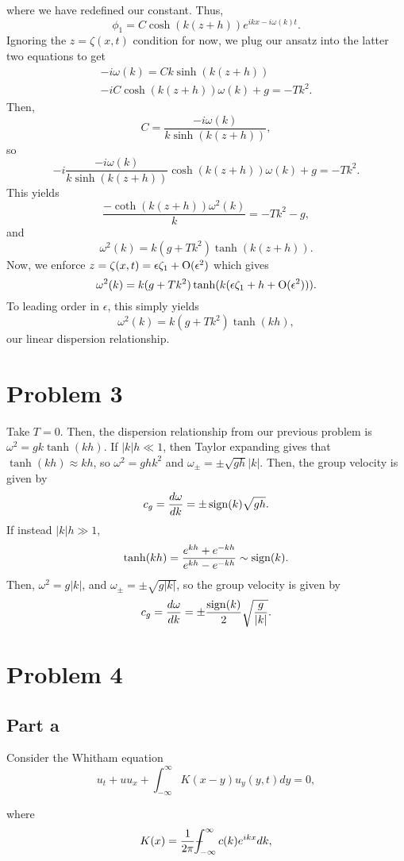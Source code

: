 \documentclass{article}
\begin{document}
where we have redefined our constant. Thus,
\[
\phi_1=C\cosh(k(z+h))e^{ikx-i\omega(k)t}.
\]
Ignoring the $z=\zeta(x,t)$ condition for now, we plug our ansatz into the latter two equations to get
\begin{eqnarray*}
	-i\omega(k)=Ck\sinh(k(z+h))\\
	-iC\cosh(k(z+h))\omega(k)+g=-Tk^2.
\end{eqnarray*}
Then,
\[
C=\frac{-i\omega(k)}{k\sinh(k(z+h))},
\]
so
\[
-i\frac{-i\omega(k)}{k\sinh(k(z+h))}\cosh(k(z+h))\omega(k)+g=-Tk^2.
\]
This yields 
\[
\frac{-\coth(k(z+h))\omega^2(k)}{k}=-Tk^2-g,
\]
and 
\[
\omega^2(k)=k(g+Tk^2)\tanh(k(z+h)).
\]
Now, we enforce $z=\zeta(x,t)=\epsilon\zeta_1+\operatorname{O}(\epsilon^2)$ which gives 
\[
\omega^2(k)=k(g+Tk^2)\tanh(k(\epsilon\zeta_1+h+\operatorname{O}(\epsilon^2))).
\]
To leading order in $\epsilon$, this simply yields
\[
\omega^2(k)=k(g+Tk^2)\tanh(kh),
\]
our linear dispersion relationship.

\section{Problem 3}
Take $T=0$. Then, the dispersion relationship from our previous problem is $\omega^2=gk\tanh(kh)$. If $|k|h\ll1$, then Taylor expanding gives that $\tanh(kh)\approx kh$, so $\omega^2=ghk^2$ and $\omega_\pm=\pm\sqrt{gh}|k|$. Then, the group velocity is given by
\[
c_g=\frac{d\omega}{dk}=\pm\operatorname{sign}(k)\sqrt{gh}.
\]
If instead $|k|h\gg1$, 
\[
\tanh(kh)=\frac{e^{kh}+e^{-kh}}{e^{kh}-e^{-kh}}\sim\operatorname{sign}(k).
\]
Then, $\omega^2=g|k|$, and $\omega_\pm=\pm\sqrt{g|k|}$, so the group velocity is given by
\[
c_g=\frac{d\omega}{dk}=\pm\frac{\operatorname{sign}(k)}{2}\sqrt{\frac{g}{|k|}}.
\]

\section{Problem 4}
\subsection{Part a}
Consider the Whitham equation 
\[
u_t+uu_x+\int_{-\infty}^\infty K(x-y)u_y(y,t)dy=0,
\]

where
\[
K(x)=\frac{1}{2\pi}\pvint_{-\infty}^\infty c(k)e^{ikx}dk,
\]
\end{document}
